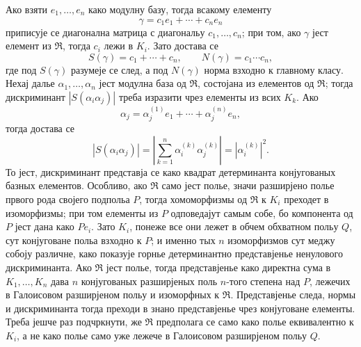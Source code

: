 \documentclass[11pt]{article}
\begin{document}
\setcounter{footnote}{27}

Ако взяти $e_1,\ldots,e_n$ како модулну базу, тогда всакому елементу
\[
        \gamma=c_1e_1+\cdots+c_ne_n
\]
приписује се диагонална матрица с диагональу $c_1,\ldots,c_n$; при том, ако $\gamma$ јест елемент из $\mathfrak R$, тогда $c_i$ лежи в $K_i$. Зато достава се
\[
        S(\gamma)=c_1+\cdots+c_n,
        \qquad
        N(\gamma)=c_1\cdots c_n,
\]
где под $S(\gamma)$ разумеје се след, а под $N(\gamma)$ норма взходно к главному класу. Нехај далье $\alpha_1,\ldots,\alpha_n$ јест модулна база од $\mathfrak R$, состојана из елементов од $\mathfrak R$; тогда дискриминант $|S(\alpha_i\alpha_j)|$ треба изразити чрез елементы из всих $K_k$. Ако
\[
        \alpha_j=\alpha_j^{(1)}e_1+\cdots+\alpha_j^{(n)}e_n,
\]
тогда достава се
\[
        |S(\alpha_i\alpha_j)|
        =
        \left|\sum_{k=1}^n \alpha_i^{(k)}\alpha_j^{(k)}\right|
        =
        \left|\alpha_i^{(k)}\right|^2.
\]
То јест, дискриминант представја се како квадрат детерминанта конјугованых базных елементов. Особливо, ако $\mathfrak R$ само јест полье, значи разширјено полье првого рода својего подпольа $P$, тогда хомоморфизмы од $\mathfrak R$ к $K_i$ преходет в изоморфизмы; при том елементы из $P$ одповедајут самым собе, бо компонента од $P$ јест дана како $P e_i$. Зато $K_i$, понеже все они лежет в обчем обхватном польу $Q$, сут конјуговане польа взходно к $P$; и именно тых $n$ изоморфизмов сут меджу собоју различне, како показује горнье детерминантно представјенье ненулового дискриминанта. Ако $\mathfrak R$ јест полье, тогда представјенье како директна сума в $K_1,\ldots,K_n$ дава $n$ конјугованых разширјеных поль $n$-того степена над $P$, лежечих в Галоисовом разширјеном польу и изоморфных к $\mathfrak R$. Представјенье следа, нормы и дискриминанта тогда преходи в знано представјенье чрез конјуговане елементы. Треба јешче раз подчркнути, же $\mathfrak R$ предполага се само како полье еквивалентно к $K_i$, а не како полье само уже лежече в Галоисовом разширјеном польу $Q$.
\end{document}
